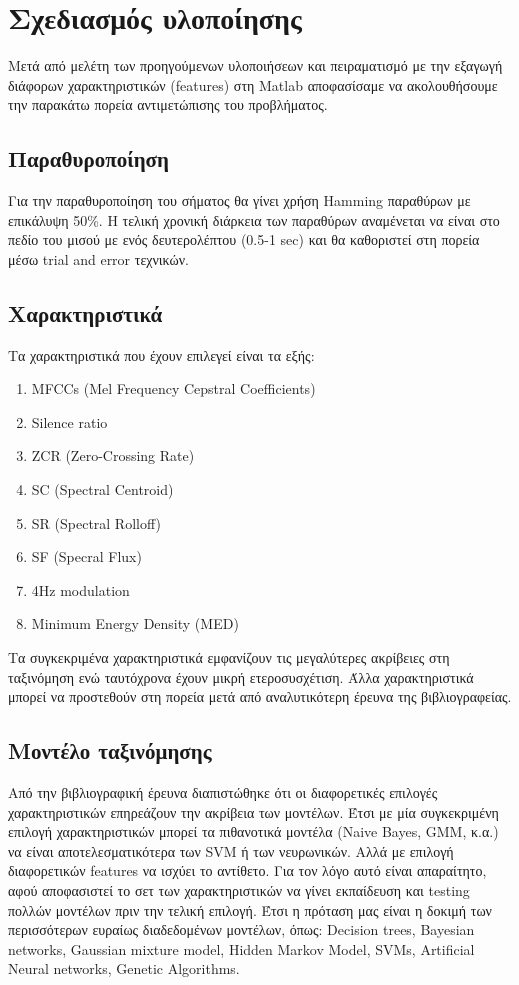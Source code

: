 \section{Σχεδιασμός υλοποίησης}

Μετά από μελέτη των προηγούμενων υλοποιήσεων και πειραματισμό με την εξαγωγή
διάφορων χαρακτηριστικών (features) στη Matlab αποφασίσαμε να ακολουθήσουμε την
παρακάτω πορεία αντιμετώπισης του προβλήματος.

\subsection{Παραθυροποίηση}

Για την παραθυροποίηση του σήματος θα γίνει χρήση Hamming παραθύρων με επικάλυψη
50\%. Η τελική χρονική διάρκεια των παραθύρων αναμένεται να είναι στο πεδίο του
μισού με ενός δευτερολέπτου (0.5-1 sec) και θα καθοριστεί στη πορεία μέσω trial
and error τεχνικών.

\subsection{Χαρακτηριστικά}

Τα χαρακτηριστικά που έχουν επιλεγεί είναι τα εξής:
\begin{enumerate}[noitemsep]
\item ΜFCCs (Mel Frequency Cepstral Coefficients)
\item Silence ratio
\item ZCR (Zero-Crossing Rate)
\item SC (Spectral Centroid)
\item SR (Spectral Rolloff)
\item SF (Specral Flux)
\item 4Hz modulation
\item Minimum Energy Density (MED)
\end{enumerate}

Τα συγκεκριμένα χαρακτηριστικά εμφανίζουν τις μεγαλύτερες ακρίβειες στη
ταξινόμηση ενώ ταυτόχρονα έχουν μικρή ετεροσυσχέτιση. Άλλα χαρακτηριστικά μπορεί
να προστεθούν στη πορεία μετά από αναλυτικότερη έρευνα της βιβλιογραφείας.

\subsection{Μοντέλο ταξινόμησης}

Από την βιβλιογραφική έρευνα διαπιστώθηκε ότι οι διαφορετικές επιλογές
χαρακτηριστικών επηρεάζουν την ακρίβεια των μοντέλων. Έτσι με μία συγκεκριμένη
επιλογή χαρακτηριστικών μπορεί τα πιθανοτικά μοντέλα (Naive Bayes, GMM, κ.α.) να
είναι αποτελεσματικότερα των SVM ή των νευρωνικών. Αλλά με επιλογή διαφορετικών
features να ισχύει το αντίθετο. Για τον λόγο αυτό είναι απαραίτητο, αφού
αποφασιστεί το σετ των χαρακτηριστικών να γίνει εκπαίδευση και testing πολλών
μοντέλων πριν την τελική επιλογή.
Έτσι η πρόταση μας είναι η δοκιμή των περισσότερων ευραίως διαδεδομένων μοντέλων,
όπως: Decision trees, Bayesian networks, Gaussian mixture model, Hidden Markov
Model, SVMs, Artificial Neural networks, Genetic Algorithms.

